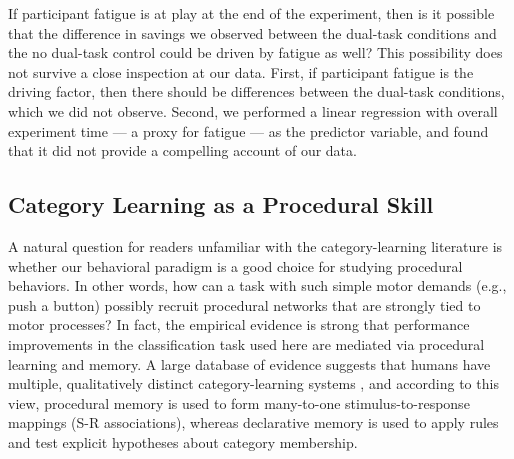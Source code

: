 If participant fatigue is at play at the end of the experiment, then is it
possible that the difference in savings we observed between the dual-task
conditions and the no dual-task control could be driven by fatigue as well? 
This possibility does not survive a close inspection at our data. First, if
participant fatigue is the driving factor, then there should be differences
between the dual-task conditions, which we did not observe. Second, we performed
a linear regression with overall experiment time --- a proxy for fatigue --- as
the predictor variable, and found that it did not provide a compelling account
of our data.


\subsection*{Category Learning as a Procedural Skill}
A natural question for readers unfamiliar with the category-learning literature
is whether our behavioral paradigm is a good choice for studying procedural
behaviors. In other words, how can a task with such simple motor demands (e.g.,
push a button) possibly recruit procedural networks that are strongly tied to
motor processes? In fact, the empirical evidence is strong that performance
improvements in the classification task used here are mediated via procedural
learning and memory. A large database of evidence suggests that humans have
multiple, qualitatively distinct category-learning systems \cite{AshbyCOVIS1998,
AshbyMaddox2005, EricksonKruschke1998}, and according to this view, procedural
memory is used to form many-to-one stimulus-to-response mappings (S-R
associations), whereas declarative memory is used to apply rules and test
explicit hypotheses about category membership.

